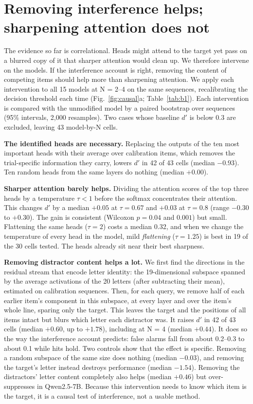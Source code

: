 \documentclass{article}
\newcommand{\dprime}{$d'$}
\begin{document}
\section{Removing interference helps; sharpening attention does not}
\label{sec:causal}

The evidence so far is correlational. Heads might attend to the target yet pass on a blurred copy of it that sharper attention would clean up. We therefore intervene on the models. If the interference account is right, removing the content of competing items should help more than sharpening attention. We apply each intervention to all 15 models at N = 2--4 on the same sequences, recalibrating the decision threshold each time (Fig.~\ref{fig:causal}a; Table~\ref{tab:b1}). Each intervention is compared with the unmodified model by a paired bootstrap over sequences (95\% intervals, 2,000 resamples). Two cases whose baseline \dprime{} is below 0.3 are excluded, leaving 43 model-by-N cells.

\textbf{The identified heads are necessary.} Replacing the outputs of the ten most important heads with their average over calibration items, which removes the trial-specific information they carry, lowers \dprime{} in 42 of 43 cells (median $-0.93$). Ten random heads from the same layers do nothing (median $+0.00$).

\textbf{Sharper attention barely helps.} Dividing the attention scores of the top three heads by a temperature $\tau<1$ before the softmax concentrates their attention. This changes \dprime{} by a median $+0.05$ at $\tau=0.67$ and $+0.03$ at $\tau=0.8$ (range $-0.30$ to $+0.30$). The gain is consistent (Wilcoxon $p=0.04$ and $0.001$) but small. Flattening the same heads ($\tau=2$) costs a median 0.32, and when we change the temperature of every head in the model, mild \emph{flattening} ($\tau=1.25$) is best in 19 of the 30 cells tested. The heads already sit near their best sharpness.

\textbf{Removing distractor content helps a lot.} We first find the directions in the residual stream that encode letter identity: the 19-dimensional subspace spanned by the average activations of the 20 letters (after subtracting their mean), estimated on calibration sequences. Then, for each query, we remove half of each earlier item's component in this subspace, at every layer and over the item's whole line, sparing only the target. This leaves the target and the positions of all items intact but blurs which letter each distractor was. It raises \dprime{} in 42 of 43 cells (median $+0.60$, up to $+1.78$), including at N = 4 (median $+0.44$). It does so the way the interference account predicts: false alarms fall from about 0.2--0.3 to about 0.1 while hits hold. Two controls show that the effect is specific. Removing a random subspace of the same size does nothing (median $-0.03$), and removing the target's letter instead destroys performance (median $-1.54$). Removing the distractors' letter content completely also helps (median $+0.46$) but over-suppresses in Qwen2.5-7B. Because this intervention needs to know which item is the target, it is a causal test of interference, not a usable method.
\end{document}
